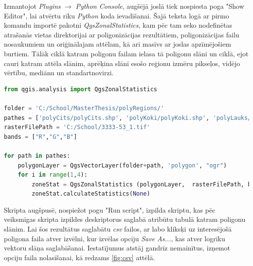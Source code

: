 \documentclass[12pt,paper=a4]{report}
\begin{document}
Izmantojot \textit{Plugins} $\rightarrow$ \textit{Python Console}, augšējā joslā tiek nospiesta poga "Show Editor", lai atvērtu rīku \textit{Python} koda ievadīšanai. Šajā teksta logā ar pirmo komandu importē pakotni \textit{QgsZonalStatistics}, kam pēc tam seko nodefinētas atrašanās vietas direktorijai ar poligonizācijas rezultātiem, poligonizācijas failu nosaukumiem un oriģinālajam attēlam, kā arī masīvs ar joslas apzīmējošiem burtiem. Tālāk ciklā katram poligonu failam ielasa tā poligonu slāni un ciklā, ejot cauri katram attēla slānim, aprēķina slānī esošo reģionu izmēru pikseļos, vidējo vērtību, mediānu un standartnovirzi.
\begin{lstlisting}[language=Python]
from qgis.analysis import QgsZonalStatistics

folder = 'C:/School/MasterThesis/polyRegions/'
pathes = ['polyCits/polyCits.shp', 'polyKoki/polyKoki.shp', 'polyLauks/polyLauks.shp', 'polyUdens/polyUdens.shp', 'polyZaliens/polyZaliens.shp',  'polyViss/polyViss.shp']
rasterFilePath = 'C:/School/3333-53_1.tif'
bands = ["R","G","B"]

for path in pathes:
    polygonLayer = QgsVectorLayer(folder+path, 'polygon', "ogr") 
    for i in range(1,4):
        zoneStat = QgsZonalStatistics (polygonLayer,  rasterFilePath, bands[i-1], i, QgsZonalStatistics.Count  | QgsZonalStatistics.Mean | QgsZonalStatistics.Median | QgsZonalStatistics.StDev)
        zoneStat.calculateStatistics(None)
\end{lstlisting}\par
Skripta augšpusē, nospiežot pogu "Run script", izpilda skriptu, kas pēc veiksmīgas skripta izpildes deskriptorus saglabā atribūtu tabulā katram poligonu slānim. Lai šos rezultātus saglabātu \textit{csv} failos, ar labo kliksķi uz interesējošā poligona faila atver izvēlni, kur izvēlas opciju \textit{Save As...}, kas atver logrīku vektoru slāņa saglabāšanai. Iestatījumus atstāj gandrīz nemainītus, izņemot opciju faila nolasīšanai, kā redzams \ref{fig:csv} attēlā.
\end{document}
